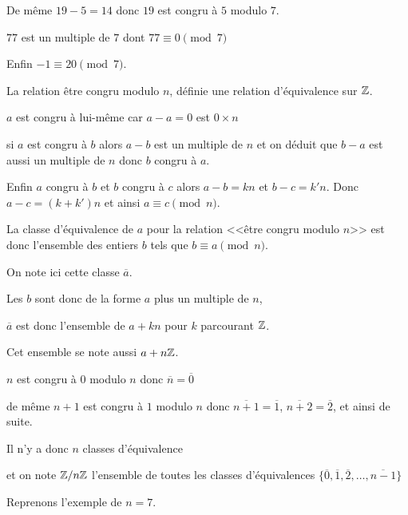 \change

De même $19-5=14$ donc $19$ est congru à $5$ modulo $7$.

\change

$77$ est un multiple de $7$ dont $77\equiv 0 \pmod 7$

\change

Enfin $-1 \equiv 20 \pmod 7$.

\change

La relation être congru modulo $n$, définie une relation d'équivalence sur $\mathbb{Z}$.

\change

$a$ est congru à lui-même car $a-a=0$ est $0 \times n$


\change

si $a$ est congru à $b$ alors $a-b$ est un multiple de $n$
et on déduit que $b-a$ est aussi un multiple de $n$ donc $b$ congru à $a$.

\change

Enfin $a$ congru à $b$ et $b$ congru à $c$
alors $a-b=kn$ et $b-c=k'n$. Donc $a-c = (k+k')n$ et ainsi 
$a \equiv c \pmod n$.


\diapo

La classe d'équivalence de $a$ pour la relation <<être congru modulo $n$>>
est donc l'ensemble des entiers $b$ tels que $b \equiv a \pmod n$.

On note ici cette classe $\overline a$.

\change

Les $b$ sont donc de la forme $a$ plus un multiple de $n$,

$\overline a$ est donc l'ensemble de $a+kn$ pour $k$ parcourant $\mathbb{Z}$.

Cet ensemble se note aussi $a+n\mathbb{Z}$.

\change

$n$ est congru à $0$ modulo $n$ donc $\overline n = \overline 0$

de même $n+1$ est congru à $1$ modulo $n$ donc $\overline {n+1} = \overline 1$,
$\overline {n+2} = \overline 2$, et ainsi de suite.

\change

Il n'y a donc $n$ classes d'équivalence

et on note $\mathbb{Z}/n\mathbb{Z}$ l'ensemble de toutes les classes d'équivalences 
$\big\{ \overline 0, \overline 1, \overline 2, \ldots, \overline{n-1} \big\}$

\change

Reprenons l'exemple de $n=7$.

